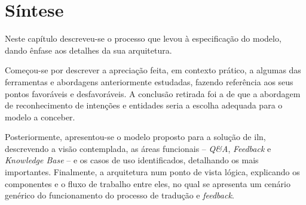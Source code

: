 \section{Síntese} 
\label{sec:chap04_chaptersummary}
Neste capítulo descreveu-se o processo que levou à especificação do modelo, dando ênfase aos detalhes da sua arquitetura. 

Começou-se por descrever a apreciação feita, em contexto prático, a algumas das ferramentas e abordagens anteriormente estudadas, fazendo referência aos seus pontos favoráveis e desfavoráveis. A conclusão retirada foi a de que a abordagem de reconhecimento de intenções e entidades seria a escolha adequada para o modelo a conceber.

Posteriormente, apresentou-se o modelo proposto para a solução de \gls{iln}, descrevendo a visão contemplada, as áreas funcionais -- \textit{Q\&A}, \textit{Feedback} e \textit{Knowledge Base} -- e os casos de uso identificados, detalhando os mais importantes. Finalmente, a arquitetura num ponto de vista lógica, explicando os componentes e o fluxo de trabalho entre eles, no qual se apresenta um cenário genérico do funcionamento do processo de tradução e \textit{feedback}.

